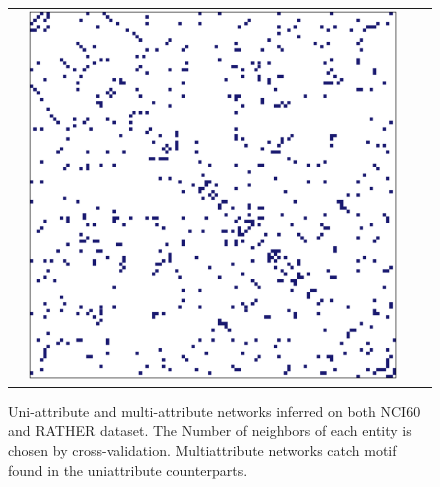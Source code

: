 \begin{figure}[htbp!]
\begin{tabular}{@{}l@{}ccc@{}}
    & \includegraphics[width=.3\textwidth]{figures/bivarNet_RATHER} \\
  \end{tabular}
  \caption{Uni-attribute and multi-attribute networks inferred on both
    NCI60 and RATHER dataset. The Number of neighbors of each entity
    is chosen by cross-validation. Multiattribute networks catch motif
    found in the uniattribute counterparts.}
  \label{fig:networks}
\end{figure}




